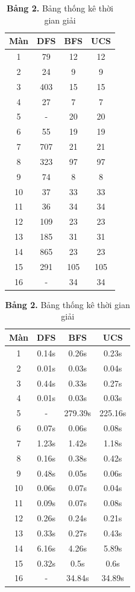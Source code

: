 \documentclass[a4paper,12pt]{article}
\begin{document}
\begin{table}[ht]
\begin{minipage}[b]{0.45\linewidth}
\centering
\begin{tabular}{|c|c|c|c|}
\hline
Màn & DFS & BFS & UCS \\
\hline
1 & 79 & 12 & 12 \\
2 & 24 & 9 & 9 \\
3 & 403 & 15 & 15 \\
4 & 27 & 7 & 7 \\
5 & - & 20 & 20 \\
6 & 55 & 19 & 19 \\
7 & 707 & 21 & 21 \\
8 & 323 & 97 & 97 \\
9 & 74 & 8 & 8 \\
10 & 37 & 33 & 33 \\
11 & 36 & 34 & 34 \\
12 & 109 & 23 & 23 \\
13 & 185 & 31 & 31 \\
14 & 865 & 23 & 23 \\
15 & 291 & 105 & 105 \\
16 & - & 34 & 34 \\
\hline
\end{tabular}
\caption*{\textbf{Bảng 1.} Bảng thống kê số đường đi}
\end{minipage}
\hspace{0.5cm}
\begin{minipage}[b]{0.45\linewidth}
\centering
\begin{tabular}{|c|c|c|c|}
\hline
Màn & DFS & BFS & UCS \\
\hline
1 & 0.14s & 0.26s & 0.23s \\
2 & 0.01s & 0.03s & 0.04s \\
3 & 0.44s & 0.33s & 0.27s \\
4 & 0.01s & 0.03s & 0.03s \\
5 & - & 279.39s & 225.16s \\
6 & 0.07s & 0.06s & 0.08s \\
7 & 1.23s & 1.42s & 1.18s \\
8 & 0.16s & 0.38s & 0.42s \\
9 & 0.48s & 0.05s & 0.06s \\
10 & 0.06s & 0.07s & 0.04s \\
11 & 0.09s & 0.07s & 0.08s \\
12 & 0.26s & 0.24s & 0.21s \\
13 & 0.33s & 0.27s & 0.43s \\
14 & 6.16s & 4.26s & 5.89s \\
15 & 0.32s & 0.5s & 0.6s \\
16 & - & 34.84s & 34.89s \\
\hline
\end{tabular}
\caption*{\textbf{Bảng 2.} Bảng thống kê thời gian giải}
\end{minipage}
\end{table}
\end{document}
